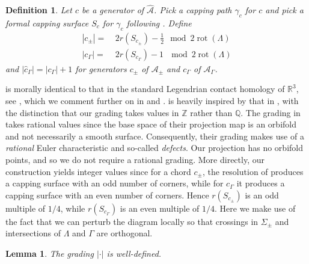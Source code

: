 \documentclass[11pt]{amsart}
\theoremstyle{mystyle}
\newtheorem{definition}{Definition}[section]
\newtheorem{lemma}[lemma]{Lemma}
\newcommand{\Q}{\mathbb{Q}}
\newcommand{\Z}{\mathbb{Z}}
\newcommand{\<}{\langle}
\renewcommand{\>}{\rangle}
\DeclareMathOperator{\rot}{\text{rot}}
\begin{document}
\begin{definition}\label{dfn:grading}
	Let $c$ be a generator of $\widehat{\mathcal{A}}$. Pick a capping path $\gamma_c$ for $c$ and pick a formal capping surface $S_c$ for $\gamma_c$ following . Define 
    \begin{align*}
        |c_\pm| =& \ 2r(S_{c_\pm}) - \frac{1}{2} \mod 2\rot(\Lambda)\\
        |c_\Gamma| =&\  2r(S_{c_\Gamma}) - 1 \ \mod 2\rot(\Lambda)
    \end{align*} and $|\widehat{c}_\Gamma| = |c_\Gamma| + 1$ for generators $c_\pm$ of $\mathcal{A}_\pm$ and $c_\Gamma$ of $\mathcal{A}_\Gamma$.
\end{definition}

 is morally identical to that in the standard Legendrian contact homology of $\mathbb{R}^3$, see \cite[Sec. 3.1]{chekanov2002dga}, which we comment further on in  and .  is heavily inspired by that in \cite[Sec. 4.2]{licata2013seifert}, with the distinction that our grading takes values in $\Z$ rather than $\Q$. The grading in \cite[Sec. 4.2]{licata2013seifert} takes rational values since the base space of their projection map is an orbifold and not necessarily a smooth surface. Consequently, their grading makes use of a \textit{rational} Euler characteristic and so-called \textit{defects}. Our projection has no orbifold points, and so we do not require a rational grading. More directly, our construction yields integer values since for a chord $c_{\pm}$, the resolution of  produces a capping surface with an odd number of corners, while for $c_{\Gamma}$ it produces a capping surface with an even number of corners. Hence $r(S_{c_\pm})$ is an odd multiple of $1/4$, while $r(S_{c_\Gamma})$ is an even multiple of $1/4$. Here we make use of the fact that we can perturb the diagram locally so that crossings in $\Sigma_\pm$ and intersections of $\Lambda$ and $\Gamma$ are orthogonal. 



\begin{lemma}\label{lem:gradingwelldefined}
	The grading $|\cdot |$ is well-defined.
\end{lemma}
\end{document}
